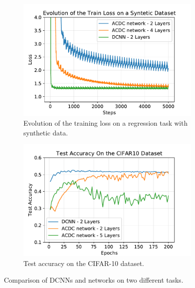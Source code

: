 \begin{figure}
   \centering
   \begin{subfigure}[b]{0.49\textwidth}
       \centering
       \includegraphics[width=\textwidth]{figures/chapter3/acdc_regression.pdf}
       \caption{Evolution of the training loss on a regression task with synthetic data.}
       \label{figure:acdc_regression}
   \end{subfigure}
   \hfill
   \begin{subfigure}[b]{0.49\textwidth}
       \centering
       \includegraphics[width=\textwidth]{figures/chapter3/acdc_cifar10.pdf}
       \caption{Test accuracy on the CIFAR-10 dataset.~\\ \phantom{.}}
       \label{figure:acdc_cifar10}
   \end{subfigure}
   \caption{Comparison of DCNNs and \ACDC networks on two different tasks.}
\end{figure}




